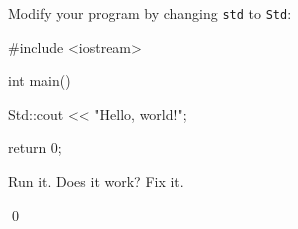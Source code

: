 Modify your program by changing \verb!std! to \verb!Std!:

\begin{console}

#include <iostream>



int main()

{

    Std::cout << "Hello, world!\n";



    return 0;

}

\end{console}

Run it. Does it work? Fix it.

\qed

